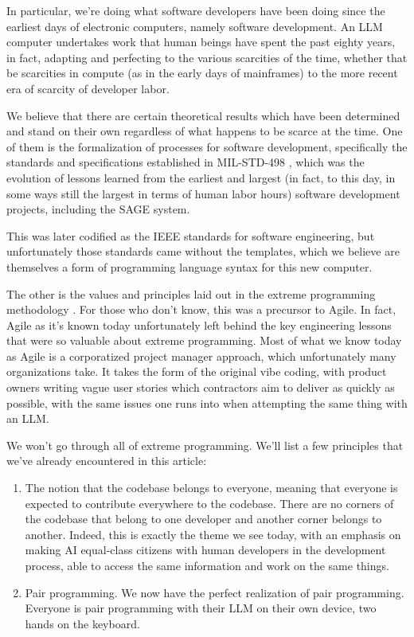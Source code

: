 \documentclass[12pt]{extarticle}
\begin{document}

In particular, we're doing what software developers have been doing since the earliest days of electronic computers, namely software development. An LLM computer undertakes work that human beings have spent the past eighty years, in fact, adapting and perfecting to the various scarcities of the time, whether that be scarcities in compute (as in the early days of mainframes) to the more recent era of scarcity of developer labor.

We believe that there are certain theoretical results which have been determined and stand on their own regardless of what happens to be scarce at the time. One of them is the formalization of processes for software development, specifically the standards and specifications established in MIL-STD-498 \cite{milstd498}, which was the evolution of lessons learned from the earliest and largest (in fact, to this day, in some ways still the largest in terms of human labor hours) software development projects, including the SAGE system.

This was later codified as the IEEE standards for software engineering, but unfortunately those standards came without the templates, which we believe are themselves a form of programming language syntax for this new computer.

The other is the values and principles laid out in the extreme programming methodology \cite{beck2000}. For those who don't know, this was a precursor to Agile. In fact, Agile as it's known today unfortunately left behind the key engineering lessons that were so valuable about extreme programming. Most of what we know today as Agile is a corporatized project manager approach, which unfortunately many organizations take. It takes the form of the original vibe coding, with product owners writing vague user stories which contractors aim to deliver as quickly as possible, with the same issues one runs into when attempting the same thing with an LLM.

We won't go through all of extreme programming. We'll list a few principles that we've already encountered in this article:
\begin{enumerate}
  \item The notion that the codebase belongs to everyone, meaning that everyone is expected to contribute everywhere to the codebase. There are no corners of the codebase that belong to one developer and another corner belongs to another. Indeed, this is exactly the theme we see today, with an emphasis on making AI equal-class citizens with human developers in the development process, able to access the same information and work on the same things.
  \item Pair programming. We now have the perfect realization of pair programming. Everyone is pair programming with their LLM on their own device, two hands on the keyboard.
\end{enumerate}
\end{document}
